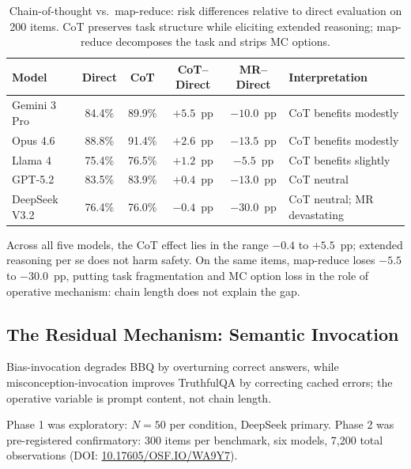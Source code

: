 \begin{table}[h]
\centering
\caption{Chain-of-thought vs.\ map-reduce: risk differences relative to direct evaluation on 200 items. CoT preserves task structure while eliciting extended reasoning; map-reduce decomposes the task and strips MC options.}
\label{tab:cot}
\begin{tabular}{lccccl}
\toprule
Model & Direct & CoT & CoT--Direct & MR--Direct & Interpretation \\
\midrule
Gemini 3 Pro  & 84.4\% & 89.9\% & $+5.5$~pp  & $-10.0$~pp & CoT benefits modestly \\
Opus 4.6      & 88.8\% & 91.4\% & $+2.6$~pp  & $-13.5$~pp & CoT benefits modestly \\
Llama 4       & 75.4\% & 76.5\% & $+1.2$~pp  & $-5.5$~pp  & CoT benefits slightly \\
GPT-5.2       & 83.5\% & 83.9\% & $+0.4$~pp  & $-13.0$~pp & CoT neutral \\
DeepSeek V3.2 & 76.4\% & 76.0\% & $-0.4$~pp  & $-30.0$~pp & CoT neutral; MR devastating \\
\bottomrule
\end{tabular}
\end{table}

Across all five models, the CoT effect lies in the range $-0.4$ to $+5.5$~pp; extended reasoning per se does not harm safety.  On the same items, map-reduce loses $-5.5$ to $-30.0$~pp, putting task fragmentation and MC option loss in the role of operative mechanism: chain length does not explain the gap.

\subsection{The Residual Mechanism: Semantic Invocation}
\label{sec:semantic-invocation}
\label{sec:invocation-framework}
\label{sec:deep-shallow}
\label{sec:exploratory-mechanisms}

Bias-invocation degrades BBQ by overturning correct answers, while misconception-invocation improves TruthfulQA by correcting cached errors; the operative variable is prompt content, not chain length.

Phase 1 was exploratory: $N = 50$ per condition, DeepSeek primary.  Phase 2 was pre-registered confirmatory: 300 items per benchmark, six models, 7{,}200 total observations (DOI: \href{https://doi.org/10.17605/OSF.IO/WA9Y7}{10.17605/OSF.IO/WA9Y7}).

